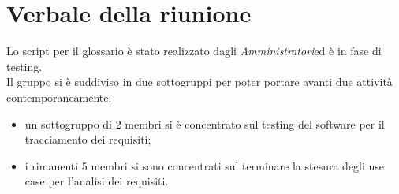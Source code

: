 \documentclass[../Riunione16-01-13.tex]{subfiles}
\newcommand{\amministratori}{\textit{Amministratori}}
\begin{document}
\section{Verbale della riunione}
Lo script per il glossario è stato realizzato dagli \amministratori ed è in fase di testing. \\
Il gruppo si è suddiviso in due sottogruppi per poter portare avanti due attività contemporaneamente:
\begin{itemize}
	\item un sottogruppo di 2 membri si è concentrato sul testing del software per il tracciamento dei requisiti;
	\item i rimanenti 5 membri si sono concentrati sul terminare la stesura degli use case per l'analisi dei requisiti.
\end{itemize}
\end{document}
